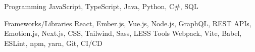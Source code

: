 

\begin{cvskills}

  \cvskill
    {Programming} %
    {JavaScript, TypeScript, Java, Python, C\#, SQL} %
    
  \cvskill
    {Frameworks/Libraries} %
    {React, Ember.js, Vue.js, Node.js, GraphQL, REST APIs, Emotion.js, Next.js, CSS, Tailwind, Sass, LESS} %
  \cvskill
    {Tools} %
    {Webpack, Vite, Babel, ESLint, npm, yarn, Git, CI/CD} %



\end{cvskills}
